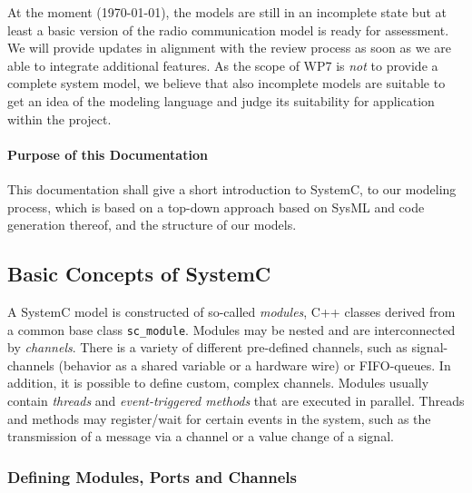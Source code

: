 \documentclass{template/openetcs_article}
\begin{document}
At the moment (\today), the models are still in an incomplete state but at least a basic version of the radio communication model is ready for assessment. We will provide updates in alignment with the review process as soon as we are able to integrate additional features. As the scope of WP7 is \emph{not} to provide a complete system model, we believe that also incomplete models are suitable to get an idea of the modeling language and judge its suitability for application within the project.

\paragraph{Purpose of this Documentation}

This documentation shall give a short introduction to SystemC, to our modeling process, which is based on a top-down approach based on SysML and code generation thereof, and the structure of our models.

\subsection{Basic Concepts of SystemC}

A SystemC model is constructed of so-called \emph{modules}, C++ classes derived from a common base class \verb|sc_module|. Modules may be nested and are interconnected by \emph{channels}. There is a variety of different pre-defined channels, such as signal-channels (behavior as a shared variable or a hardware wire) or FIFO-queues. In addition, it is possible to define custom, complex channels. Modules usually contain \emph{threads} and \emph{event-triggered methods} that are executed in parallel. Threads and methods may register/wait for certain events in the system, such as the transmission of a message via a channel or a value change of a signal.

\subsubsection{Defining Modules, Ports and Channels}


\newcommand{\tikzrect}[1]{\draw ($#1+(-0.25,-0.25)$) -- ($#1+(-0.25,+0.25)$) -- ($#1+(+0.25,+0.25)$) -- ($#1+(+0.25,-0.25)$) --cycle;}
\newcommand{\tikzport}[4]{\draw[fill=white] ($#1+(-0.25,-0.25)$) -- ($#1+(-0.25,+0.25)$) -- ($#1+(+0.25,+0.25)$) -- ($#1+(+0.25,-0.25)$) --cycle;
                          \draw[arrows=#2] ($#1+(-0.15,0)$) -- ($#1+(+0.15,0)$);
                          \path ($#1+#3$) node {#4};}
\end{document}
